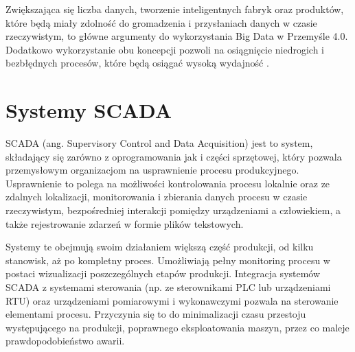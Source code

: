 Zwiększająca się liczba danych, tworzenie inteligentnych fabryk oraz produktów, które będą miały zdolność do gromadzenia i przysłaniach danych w czasie rzeczywistym, to główne argumenty do wykorzystania Big Data w Przemyśle 4.0. Dodatkowo wykorzystanie obu koncepcji pozwoli na osiągnięcie niedrogich i bezbłędnych procesów, które będą osiągać wysoką wydajność \cite{Industry40}.  





\section{Systemy SCADA}
\label{sec:SCADA}

SCADA (ang. Supervisory Control and Data Acquisition) jest to system, składający się zarówno z oprogramowania jak i części sprzętowej, który pozwala przemysłowym organizacjom na usprawnienie procesu produkcyjnego. Usprawnienie to polega na możliwości kontrolowania procesu lokalnie oraz ze zdalnych lokalizacji, monitorowania i zbierania danych procesu w czasie rzeczywistym, bezpośredniej interakcji pomiędzy urządzeniami a człowiekiem, a także rejestrowanie zdarzeń w formie plików tekstowych.

Systemy te obejmują swoim działaniem większą część produkcji, od kilku stanowisk, aż po kompletny proces. Umożliwiają pełny monitoring procesu w postaci wizualizacji poszczególnych etapów produkcji. Integracja systemów SCADA z systemami sterowania (np. ze sterownikami PLC lub urządzeniami RTU) oraz urządzeniami pomiarowymi i wykonawczymi pozwala na sterowanie elementami procesu. Przyczynia się to do minimalizacji czasu przestoju występującego na produkcji, poprawnego eksploatowania maszyn, przez co maleje prawdopodobieństwo awarii.


